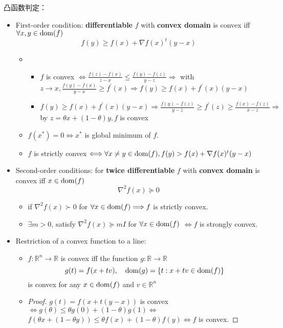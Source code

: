 \begin{remark}
    凸函数判定：
    \begin{itemize}
        \item First-order condition: \textbf{differentiable} $f$ with \textbf{convex domain} is convex iff $\forall x, y \in \operatorname{dom}(f)$\[f(y) \geq f(x)+\nabla f(x)^{t}(y-x)\]
        \begin{itemize}
            \item \proof\text{}\begin{itemize}
                \item $f$ is convex $\Longleftrightarrow \frac{f(z)-f(x)}{z-x} \leq \frac{f(y)-f(z)}{y-z} \Longrightarrow $ with $z \to x,\frac{f(y)-f(x)}{y-x} \ge f^\prime(x) \Longrightarrow f(y) \ge f(x) + f^\prime(x)(y - x)$
                \item $f(y) \ge f(x) + f^\prime(x)(y - x) \Longrightarrow \frac{f(y) - f(z)}{y - z} \ge f^\prime(z) \ge \frac{f(x) - f(z)}{x - z} \Longrightarrow $ by $z = \theta x + (1 - \theta)y,f$ is convex
            \end{itemize}
            \item $f(x^*) = 0 \Longleftrightarrow x^*$ is global minimum of $f$. 
            \item $f$ is strictly convex $\Longleftrightarrow \forall x \neq y\in \operatorname{dom}(f), f(y) > f(x) + \nabla f(x)^t(y - x)$
        \end{itemize}
        \item Second-order conditions: for \textbf{twice differentiable} $f$ with \textbf{convex domain} is convex iff $x \in \operatorname{dom}(f)$ \[\nabla^2f(x) \succeq 0\]
        \begin{itemize}
            \item if $\nabla^2 f(x) \succ 0$ for $\forall x \in \operatorname{dom}(f) \Longrightarrow f$ is strictly convex.
            \item $\exists m > 0$, satisfy $\nabla^2f(x) \succeq mI$ for $\forall x \in \operatorname{dom}(f)$ $\Longleftrightarrow f$ is strongly convex.
        \end{itemize}
        \item Restriction of a convex function to a line:
        \begin{itemize}
            \item $f: \mathbb{R}^n \to \mathbb{R}$ is convex iff the function $g: \mathbb{R} \to \mathbb{R}$\[g(t) = f(x + tv), \quad \operatorname{dom}(g) = \left\{t: x + tv \in \operatorname{dom}(f)\right\}\] is convex for any $x \in \operatorname{dom}(f)$ and $v \in \mathbb{R}^n$
            \item \begin{proof}$g(t) = f(x + t(y - x))$ is convex $\Longleftrightarrow g(\theta) \le \theta g(0) + (1 - \theta)g(1) \Longleftrightarrow$ $f(\theta x + (1 - \theta y)) \le \theta f(x) + (1 - \theta)f(y) \Longleftrightarrow f$ is convex.\end{proof}
        \end{itemize}
    \end{itemize}
\end{remark}

